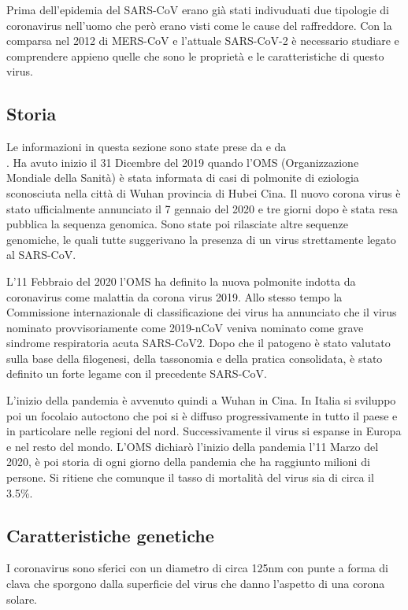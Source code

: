 Prima dell'epidemia del SARS-CoV erano già stati indivuduati due tipologie di coronavirus nell'uomo che però erano visti come le cause del raffreddore. Con la comparsa
nel 2012 di MERS-CoV e l'attuale SARS-CoV-2 è necessario studiare e comprendere appieno quelle che sono le proprietà e le caratteristiche di questo virus. 

\subsection{Storia}\label{subsec:es_subsec}
Le informazioni in questa sezione sono state prese da \cite{StoriaCovid} e da \\
\cite{ReportCovid}.
Ha avuto inizio il 31 Dicembre del 2019 quando l'OMS (Organizzazione Mondiale della Sanità) è stata informata di casi di polmonite di eziologia sconosciuta nella città di Wuhan provincia di Hubei Cina. Il nuovo corona virus è stato ufficialmente annunciato il 7 gennaio del 2020 e tre giorni dopo è stata resa pubblica la sequenza genomica. Sono state poi rilasciate altre sequenze genomiche, le quali tutte suggerivano la presenza di un virus strettamente legato al SARS-CoV. 

L'11 Febbraio del 2020 l'OMS ha definito la nuova polmonite indotta da coronavirus come malattia da corona virus 2019. Allo stesso tempo la Commissione internazionale di classificazione dei virus ha annunciato che il virus nominato provvisoriamente come 2019-nCoV veniva nominato come grave sindrome respiratoria acuta SARS-CoV2. Dopo che il patogeno è stato valutato sulla base della filogenesi, della tassonomia e della pratica consolidata, è stato definito un forte legame con il precedente SARS-CoV. 

L'inizio della pandemia è avvenuto quindi a Wuhan in Cina. In Italia si sviluppo poi un focolaio autoctono che poi si è diffuso progressivamente in tutto il paese e in particolare nelle regioni del nord. Successivamente il virus si espanse in Europa e nel resto del mondo. L'OMS dichiarò l'inizio della pandemia l'11 Marzo del 2020, è poi storia di ogni giorno della pandemia che ha raggiunto milioni di persone. Si ritiene che comunque il tasso di mortalità del virus sia di circa il 3.5\%.  

\subsection{Caratteristiche genetiche}\label{subsec:es_subsec}
I coronavirus sono sferici con un diametro di circa 125nm con punte a forma di clava che sporgono dalla superficie del virus che danno l'aspetto di una corona solare. 

